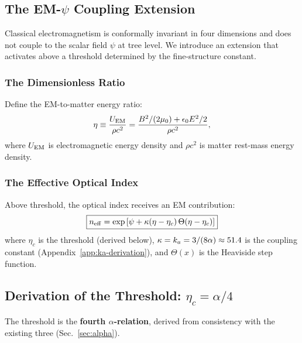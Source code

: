 \subsection{The EM-$\psi$ Coupling Extension}\label{sec:em-psi-coupling}

Classical electromagnetism is conformally invariant in four dimensions and does 
not couple to the scalar field $\psi$ at tree level. We introduce an extension 
that activates above a threshold determined by the fine-structure constant.

\subsubsection{The Dimensionless Ratio}

Define the EM-to-matter energy ratio:
\begin{equation}
\eta \equiv \frac{U_{\rm EM}}{\rho c^2} = \frac{B^2/(2\mu_0) + \epsilon_0 E^2/2}{\rho c^2},
\label{eq:eta-def}
\end{equation}
where $U_{\rm EM}$ is electromagnetic energy density and $\rho c^2$ is matter 
rest-mass energy density.

\subsubsection{The Effective Optical Index}

Above threshold, the optical index receives an EM contribution:
\begin{equation}
\boxed{n_{\rm eff} = \exp\left[\psi + \kappa(\eta - \eta_c)\,\Theta(\eta - \eta_c)\right]}
\label{eq:n-eff}
\end{equation}
where $\eta_c$ is the threshold (derived below), $\kappa = k_a = 3/(8\alpha) \approx 51.4$ is 
the coupling constant (Appendix~\ref{app:ka-derivation}), and $\Theta(x)$ is the Heaviside step function.

\subsection{Derivation of the Threshold: $\eta_c = \alpha/4$}\label{sec:eta-derivation}

The threshold is the \textbf{fourth $\alpha$-relation}, derived from consistency 
with the existing three (Sec.~\ref{sec:alpha}).

